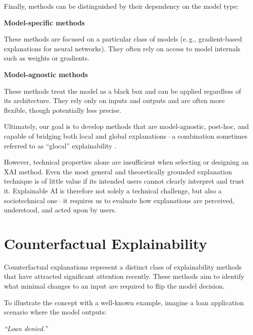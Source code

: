\newpage

Finally, methods can be distinguished by their dependency on the model type:

\begin{multicols}{2}
    \centering \textbf{Model-specific methods} \\[4pt]
    \raggedright
    These methods are focused on a particular class of models (e.\,g., gradient-based explanations for neural networks).
    They often rely on access to model internals such as weights or gradients.

    \columnbreak

    \centering \textbf{Model-agnostic methods} \\[4pt]
    \raggedright
    These methods treat the model as a black box and can be applied regardless of its architecture.
    They rely only on inputs and outputs and are often more flexible, though potentially less precise.
\end{multicols}

Ultimately, our goal is to develop methods that are model-agnostic, post-hoc, and capable of bridging both local and
global explanations\,--\,a combination sometimes referred to as \enquote{glocal} explainability \cite{achtibat2023attribution}.

However, technical properties alone are insufficient when selecting or designing an XAI method.
Even the most general and theoretically grounded explanation technique is of little value if its intended users cannot clearly interpret and trust it.
Explainable AI is therefore not solely a technical challenge, but also a sociotechnical one\,--\,it requires us to evaluate how explanations are perceived,
understood, and acted upon by users.


\section{Counterfactual Explainability}

Counterfactual explanations represent a distinct class of explainability methods that have attracted significant attention recently.
These methods aim to identify what minimal changes to an input are required to flip the model decision.

To illustrate the concept with a well-known example, imagine a loan application scenario where the model outputs:

\begin{center}
    \textit{\enquote{Loan denied.}}
\end{center}

